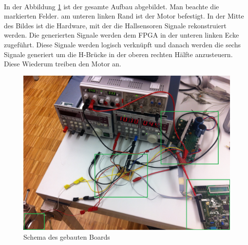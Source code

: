 \\
In der Abbildung \ref{abb:MessplatzAufbau} ist der gesamte Aufbau abgebildet. Man beachte die markierten Felder. am unteren linken Rand ist der Motor befestigt. In der Mitte des Bildes ist die Hardware, mit der die Hallsensoren Signale rekonstruiert werden. Die generierten Signale werden dem FPGA in der unteren linken Ecke zugeführt. Diese Signale werden logisch verknüpft und danach werden die sechs Signale generiert um die H-Brücke in der oberen rechten Hälfte anzusteuern. Diese Wiederum treiben den Motor an.
\begin{figure}[h!]
	\includegraphics[scale=0.14]{Funktionstests/Bilder/MessplatzAufbau.jpg}
	\centering
	\caption{Schema des gebauten Boards} 
\label{abb:MessplatzAufbau}
\end{figure}